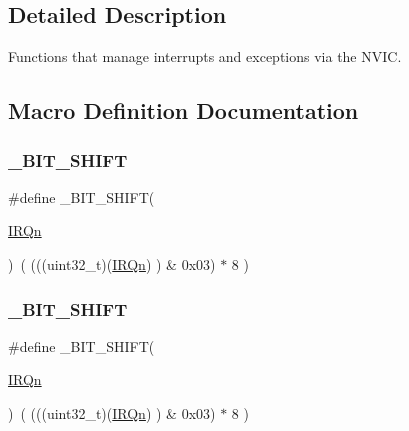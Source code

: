\subsection{Detailed Description}
Functions that manage interrupts and exceptions via the N\+V\+IC. 



\subsection{Macro Definition Documentation}
\mbox{\label{group___c_m_s_i_s___core___n_v_i_c_functions_ga53c75b28823441c6153269f0ecbed878}} 
\subsubsection{\texorpdfstring{\_BIT\_SHIFT}{\_BIT\_SHIFT}\hspace{0.1cm}{\footnotesize\ttfamily [1/3]}}
{\footnotesize\ttfamily \#define \+\_\+\+B\+I\+T\+\_\+\+S\+H\+I\+FT(\begin{DoxyParamCaption}\item[{}]{\mbox{\hyperlink{group___configuration__section__for___c_m_s_i_s_ga666eb0caeb12ec0e281415592ae89083}{I\+R\+Qn}} }\end{DoxyParamCaption})~(  (((uint32\+\_\+t)(\mbox{\hyperlink{group___configuration__section__for___c_m_s_i_s_ga666eb0caeb12ec0e281415592ae89083}{I\+R\+Qn}})       )    \&  0x03) $\ast$ 8 )}

\mbox{\label{group___c_m_s_i_s___core___n_v_i_c_functions_ga53c75b28823441c6153269f0ecbed878}} 
\subsubsection{\texorpdfstring{\_BIT\_SHIFT}{\_BIT\_SHIFT}\hspace{0.1cm}{\footnotesize\ttfamily [2/3]}}
{\footnotesize\ttfamily \#define \+\_\+\+B\+I\+T\+\_\+\+S\+H\+I\+FT(\begin{DoxyParamCaption}\item[{}]{\mbox{\hyperlink{group___configuration__section__for___c_m_s_i_s_ga666eb0caeb12ec0e281415592ae89083}{I\+R\+Qn}} }\end{DoxyParamCaption})~(  (((uint32\+\_\+t)(\mbox{\hyperlink{group___configuration__section__for___c_m_s_i_s_ga666eb0caeb12ec0e281415592ae89083}{I\+R\+Qn}})       )    \&  0x03) $\ast$ 8 )}

